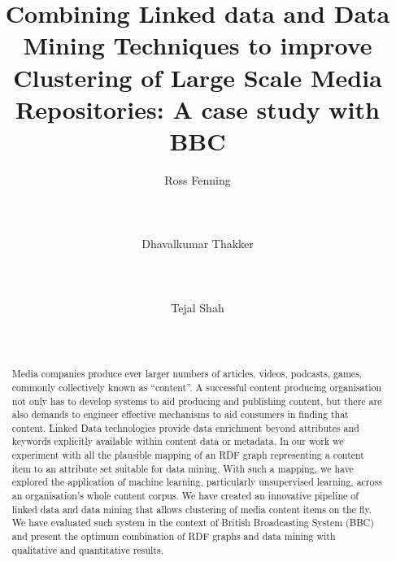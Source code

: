 \documentclass{sig-alternate-05-2015}
\begin{document}
\title{Combining Linked data and Data Mining Techniques to improve Clustering of Large Scale Media Repositories: A case study with BBC}

\author{
\alignauthor
Ross Fenning\\
       \\
       \\
       \\
\alignauthor
Dhavalkumar Thakker\\
       \\
       \\
       \\
\alignauthor Tejal Shah\\
       \\
       \\
}

\maketitle
\begin{abstract}
Media companies produce ever larger numbers of articles, videos, podcasts, games, commonly collectively known as ``content''. A successful content producing organisation not only has to develop systems to aid producing and publishing content, but there are also demands to engineer effective mechanisms to aid consumers in finding that content. Linked Data technologies provide data enrichment beyond attributes and keywords explicitly available within content data or metadata. In our work we experiment with all the plausible mapping of an RDF graph representing a content item to an attribute set suitable for data mining. With such a mapping, we have explored the application of machine learning, particularly unsupervised learning, across an organisation's whole content corpus. We have created an innovative pipeline of linked data and data mining that allows clustering of media content items on the fly. We have evaluated such system in the context of British Broadcasting System (BBC) and present the optimum combination of RDF graphs and data mining with qualitative and quantitative results.
\end{abstract}
\end{document}
